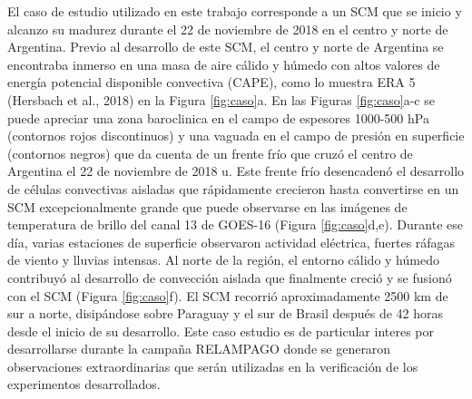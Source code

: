 \documentclass[12pt,oneside,a4paper]{reedthesis}
\begin{document}
El caso de estudio utilizado en este trabajo corresponde a un SCM que se inicio y alcanzo su madurez durante el 22 de noviembre de 2018 en el centro y norte de Argentina. Previo al desarrollo de este SCM, el centro y norte de Argentina se encontraba inmerso en una masa de aire cálido y húmedo con altos valores de energía potencial disponible convectiva (CAPE), como lo muestra ERA 5 (Hersbach et al., 2018) en la Figura \ref{fig:caso}a. En las Figuras \ref{fig:caso}a-c se puede apreciar una zona baroclinica en el campo de espesores 1000-500 hPa (contornos rojos discontinuos) y una vaguada en el campo de presión en superficie (contornos negros) que da cuenta de un frente frío que cruzó el centro de Argentina el 22 de noviembre de 2018 u. Este frente frío desencadenó el desarrollo de células convectivas aisladas que rápidamente crecieron hasta convertirse en un SCM excepcionalmente grande que puede observarse en las imágenes de temperatura de brillo del canal 13 de GOES-16 (Figura \ref{fig:caso}d,e). Durante ese día, varias estaciones de superficie observaron actividad eléctrica, fuertes ráfagas de viento y lluvias intensas. Al norte de la región, el entorno cálido y húmedo contribuyó al desarrollo de convección aislada que finalmente creció y se fusionó con el SCM (Figura \ref{fig:caso}f). El SCM recorrió aproximadamente 2500 km de sur a norte, disipándose sobre Paraguay y el sur de Brasil después de 42 horas desde el inicio de su desarrollo. Este caso estudio es de particular interes por desarrollarse durante la campaña RELAMPAGO donde se generaron observaciones extraordinarias que serán utilizadas en la verificación de los experimentos desarrollados.
\end{document}
